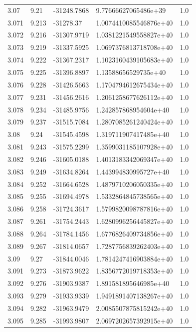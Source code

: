 \begin{tabular}{lllll}
3.07 & 9.21 & -31248.7868 & 9.77666627065486e+39 & 1.0 \\
3.071 & 9.213 & -31278.37 & 1.0074410085546876e+40 & 1.0 \\
3.072 & 9.216 & -31307.9719 & 1.0381221549558827e+40 & 1.0 \\
3.073 & 9.219 & -31337.5925 & 1.0697376813718708e+40 & 1.0 \\
3.074 & 9.222 & -31367.2317 & 1.1023160439105683e+40 & 1.0 \\
3.075 & 9.225 & -31396.8897 & 1.13588656529735e+40 & 1.0 \\
3.076 & 9.228 & -31426.5663 & 1.1704794612675434e+40 & 1.0 \\
3.077 & 9.231 & -31456.2616 & 1.2061258677626112e+40 & 1.0 \\
3.078 & 9.234 & -31485.9756 & 1.242857868954604e+40 & 1.0 \\
3.079 & 9.237 & -31515.7084 & 1.2807085261240424e+40 & 1.0 \\
3.08 & 9.24 & -31545.4598 & 1.319711907417485e+40 & 1.0 \\
3.081 & 9.243 & -31575.2299 & 1.3599031185107928e+40 & 1.0 \\
3.082 & 9.246 & -31605.0188 & 1.4013183342069347e+40 & 1.0 \\
3.083 & 9.249 & -31634.8264 & 1.443994830995727e+40 & 1.0 \\
3.084 & 9.252 & -31664.6528 & 1.4879710206050335e+40 & 1.0 \\
3.085 & 9.255 & -31694.4978 & 1.5332864845738565e+40 & 1.0 \\
3.086 & 9.258 & -31724.3617 & 1.5799820098787816e+40 & 1.0 \\
3.087 & 9.261 & -31754.2443 & 1.6280996256445827e+40 & 1.0 \\
3.088 & 9.264 & -31784.1456 & 1.6776826409734856e+40 & 1.0 \\
3.089 & 9.267 & -31814.0657 & 1.7287756839262403e+40 & 1.0 \\
3.09 & 9.27 & -31844.0046 & 1.7814247416903884e+40 & 1.0 \\
3.091 & 9.273 & -31873.9622 & 1.8356772019718353e+40 & 1.0 \\
3.092 & 9.276 & -31903.9387 & 1.891581895646985e+40 & 1.0 \\
3.093 & 9.279 & -31933.9339 & 1.9491891407138267e+40 & 1.0 \\
3.094 & 9.282 & -31963.9479 & 2.0085507875815242e+40 & 1.0 \\
3.095 & 9.285 & -31993.9807 & 2.0697202657392915e+40 & 1.0 \\

\end{tabular}
